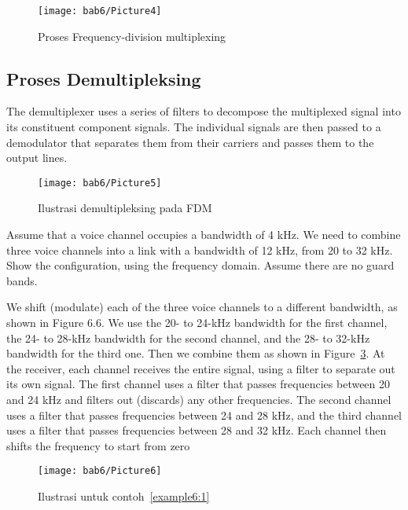 \begin{figure}[htbp]
  \centering
  \texttt{[image: bab6/Picture4]}
  \caption{Proses Frequency-division multiplexing}
  \label{fig6:3}
\end{figure}

\subsection*{Proses Demultipleksing}
The demultiplexer uses a series of filters to decompose the multiplexed signal into its constituent component signals. The individual signals are then passed to a demodulator that separates them from their carriers and passes them to the output lines.

\begin{figure}[htbp]
  \centering
  \texttt{[image: bab6/Picture5]}
  \caption{Ilustrasi demultipleksing pada FDM}
  \label{fig6:4}
\end{figure}


\begin{example}
  Assume that a voice channel occupies a bandwidth of 4 kHz. We need to combine three voice channels into a link with a bandwidth of 12 kHz, from 20 to 32 kHz. Show the configuration, using the frequency domain. Assume there are no guard bands.
  \label{example6:1}
\end{example}

\begin{solution}
  We shift (modulate) each of the three voice channels to a different bandwidth, as shown in Figure 6.6. We use the 20- to 24-kHz bandwidth for the first channel, the 24- to 28-kHz bandwidth for the second channel, and the 28- to 32-kHz bandwidth for the third one. Then we combine them as shown in Figure~\ref{fig6:5}. At the receiver, each channel receives the entire signal, using a filter to separate out its own signal. The first channel uses a filter that passes frequencies between 20 and 24 kHz and filters out (discards) any other frequencies. The second channel uses a filter that passes frequencies between 24 and 28 kHz, and the third channel uses a filter that passes frequencies between 28 and 32 kHz. Each channel then shifts the frequency to start from zero
\end{solution}

\begin{figure}[htbp]
  \centering
  \texttt{[image: bab6/Picture6]}
  \caption{Ilustrasi untuk contoh~\ref{example6:1}}
  \label{fig6:5}
\end{figure}

